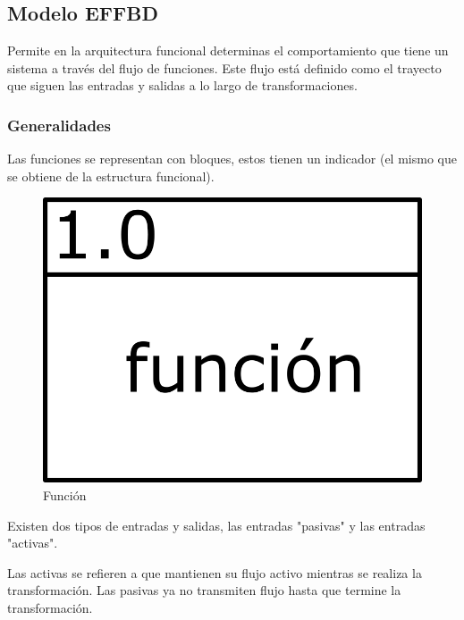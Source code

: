 \subsection{Modelo EFFBD}
Permite en la arquitectura funcional determinas el comportamiento que tiene un sistema a través del flujo de funciones. Este flujo está definido como el trayecto que siguen las entradas y salidas a lo largo de transformaciones.

\subsubsection{Generalidades}
Las funciones se representan con bloques, estos tienen un indicador (el mismo que se obtiene de la estructura funcional).

\begin{figure}[h!]
    \centering
        \includegraphics[scale=0.05]{Proyecto Integrador Figuras/16 Funcion.png}
        \caption{Función}
\end{figure}

Existen dos tipos de entradas y salidas, las entradas "pasivas" y las entradas "activas".

Las activas se refieren a que mantienen su flujo activo mientras se realiza la transformación. Las pasivas ya no transmiten flujo hasta que termine la transformación. 

